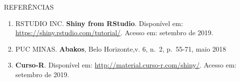 \documentclass[
  ignorenonframetext,
]{beamer}
\providecommand{\tightlist}{%
  \setlength{\itemsep}{0pt}\setlength{\parskip}{0pt}}
\begin{document}
\begin{frame}{REFERÊNCIAS}
\protect\hypertarget{referencias}{}

\begin{enumerate}
\tightlist
\item
  RSTUDIO INC. \textbf{Shiny from RStudio}. Disponível em:
  \url{https://shiny.rstudio.com/tutorial/}. Acesso em: setembro de
  2019.
\item
  PUC MINAS. \textbf{Abakos}, Belo Horizonte,v. 6, n.~2, p.~55-71, maio
  2018
\item
  \textbf{Curso-R}. Disponível em:
  \url{http://material.curso-r.com/shiny/}. Acesso em: setembro de 2019.
\end{enumerate}

\end{frame}
\end{document}

